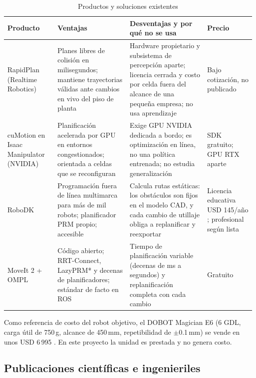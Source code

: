 \documentclass[11pt,a4paper,twoside]{article}
\begin{document}
\begin{table}[H]
\centering
\caption{Productos y soluciones existentes}
\label{tab:productos}
\small
\renewcommand{\arraystretch}{1.25}
\begin{tabularx}{\textwidth}{@{}>{\raggedright\arraybackslash}p{2.5cm}>{\raggedright\arraybackslash}X>{\raggedright\arraybackslash}X>{\raggedright\arraybackslash}p{2.6cm}@{}}
\toprule
\textbf{Producto} & \textbf{Ventajas} & \textbf{Desventajas y por qué no se usa} & \textbf{Precio} \\
\midrule
RapidPlan (Realtime Robotics) \cite{rapidplan} & Planes libres de colisión en milisegundos; mantiene trayectorias válidas ante cambios en vivo del piso de planta & Hardware propietario y subsistema de percepción aparte; licencia cerrada y costo por celda fuera del alcance de una pequeña empresa; no usa aprendizaje & Bajo cotización, no publicado \\
cuMotion en Isaac Manipulator (NVIDIA) \cite{cumotion} & Planificación acelerada por GPU en entornos congestionados; orientada a celdas que se reconfiguran & Exige GPU NVIDIA dedicada a bordo; es optimización en línea, no una política entrenada; no estudia generalización & SDK gratuito; GPU RTX aparte \\
RoboDK \cite{robodk} & Programación fuera de línea multimarca para más de mil robots; planificador PRM propio; accesible & Calcula rutas estáticas: los obstáculos son fijos en el modelo CAD, y cada cambio de utillaje obliga a replanificar y reexportar & Licencia educativa USD 145/año \cite{contexto}; profesional según lista \\
MoveIt 2 + OMPL \cite{moveit,ompl} & Código abierto; RRT-Connect, LazyPRM* y decenas de planificadores; estándar de facto en ROS & Tiempo de planificación variable (decenas de ms a segundos) y replanificación completa con cada cambio & Gratuito \\
\bottomrule
\end{tabularx}
\end{table}

Como referencia de costo del robot objetivo, el DOBOT Magician E6 (6 GDL, carga útil de 750\,g, alcance de 450\,mm, repetibilidad de $\pm$0.1\,mm) se vende en unos USD 6\,995 \cite{e6precio}. En este proyecto la unidad es prestada y no genera costo.

\subsection{Publicaciones científicas e ingenieriles}
\end{document}
